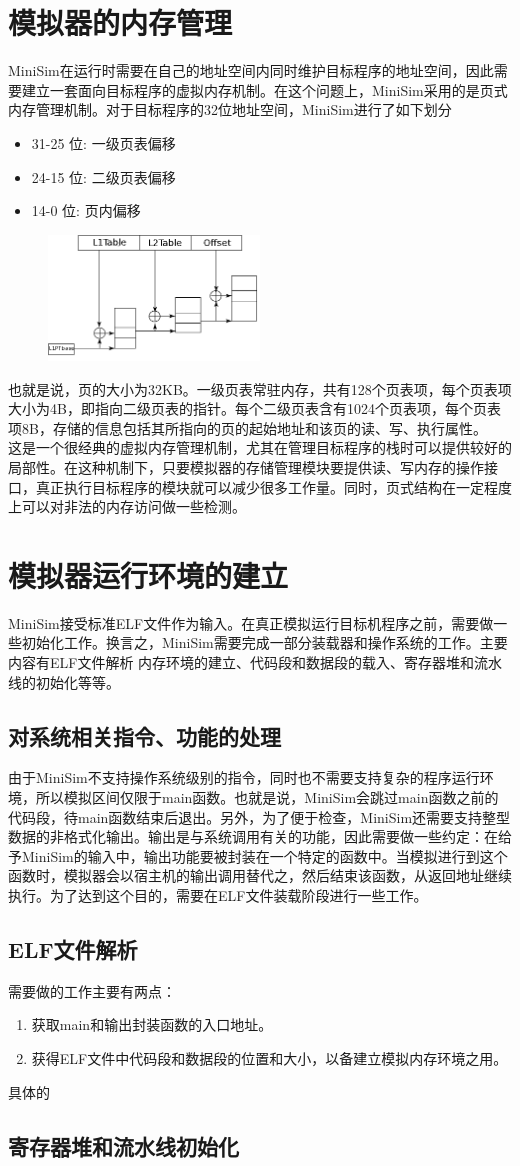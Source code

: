 \documentclass[12pt,a4paper,Flow]{report}
\begin{document}
  \section{模拟器的内存管理}
  MiniSim在运行时需要在自己的地址空间内同时维护目标程序的地址空间，因此需要建立一套面向目标程序的虚拟内存机制。在这个问题上，MiniSim采用的是页式内存管理机制。对于目标程序的32位地址空间，MiniSim进行了如下划分
  \begin{itemize}
  \item 31-25 位: 一级页表偏移
  \item 24-15 位: 二级页表偏移
  \item 14-0 位: 页内偏移
  \end{itemize}
  \begin{figure}[H]
    \centering
    \includegraphics[width=0.5\textwidth]{pt.png}
  \end{figure}
  也就是说，页的大小为32KB。一级页表常驻内存，共有128个页表项，每个页表项大小为4B，即指向二级页表的指针。每个二级页表含有1024个页表项，每个页表项8B，存储的信息包括其所指向的页的起始地址和该页的读、写、执行属性。\\
  \indent 这是一个很经典的虚拟内存管理机制，尤其在管理目标程序的栈时可以提供较好的局部性。在这种机制下，只要模拟器的存储管理模块要提供读、写内存的操作接口，真正执行目标程序的模块就可以减少很多工作量。同时，页式结构在一定程度上可以对非法的内存访问做一些检测。
  \section{模拟器运行环境的建立}
  MiniSim接受标准ELF文件作为输入。在真正模拟运行目标机程序之前，需要做一些初始化工作。换言之，MiniSim需要完成一部分装载器和操作系统的工作。主要内容有ELF文件解析
内存环境的建立、代码段和数据段的载入、寄存器堆和流水线的初始化等等。
  \subsection{对系统相关指令、功能的处理}
  由于MiniSim不支持操作系统级别的指令，同时也不需要支持复杂的程序运行环境，所以模拟区间仅限于main函数。也就是说，MiniSim会跳过main函数之前的代码段，待main函数结束后退出。另外，为了便于检查，MiniSim还需要支持整型数据的非格式化输出。输出是与系统调用有关的功能，因此需要做一些约定：在给予MiniSim的输入中，输出功能要被封装在一个特定的函数中。当模拟进行到这个函数时，模拟器会以宿主机的输出调用替代之，然后结束该函数，从返回地址继续执行。为了达到这个目的，需要在ELF文件装载阶段进行一些工作。
  \subsection{ELF文件解析}
  需要做的工作主要有两点：
  \begin{enumerate}
  \item 获取main和输出封装函数的入口地址。
  \item 获得ELF文件中代码段和数据段的位置和大小，以备建立模拟内存环境之用。
  \end{enumerate}
  具体的
  \subsection{寄存器堆和流水线初始化}
  
\end{document}
